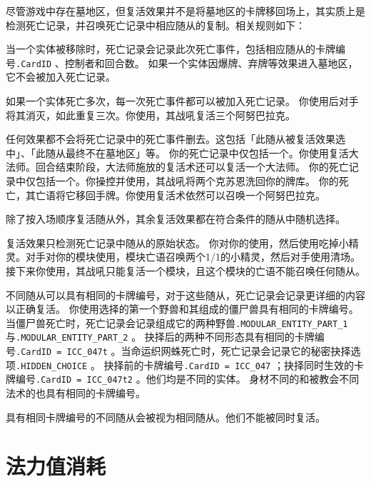 尽管游戏中存在墓地区，但复活效果并不是将墓地区的卡牌移回场上，其实质上是检测死亡记录，并召唤死亡记录中相应随从的复制。相关规则如下：

当一个实体被移除时，死亡记录会记录此次死亡事件，包括相应随从的卡牌编号\texttt{.CardID} 、控制者和回合数。
\notice 如果一个实体因爆牌、弃牌等效果进入墓地区，它不会被加入死亡记录。

如果一个实体死亡多次，每一次死亡事件都可以被加入死亡记录。
\example 你使用后对手将其消灭，如此重复三次。你使用，其战吼复活三个阿努巴拉克。

任何效果都不会将死亡记录中的死亡事件删去。这包括「此随从被复活效果选中」、「此随从最终不在墓地区」等。
\example 你的死亡记录中仅包括一个。你使用复活大法师。回合结束阶段，大法师施放的复活术还可以复活一个大法师。
\example 你的死亡记录中仅包括一个。你操控并使用，其战吼将两个克苏恩洗回你的牌库。
\example {} 你的死亡，其亡语将它移回手牌。你使用复活术依然可以召唤一个阿努巴拉克。

除了按入场顺序复活随从外，其余复活效果都在符合条件的随从中随机选择。

复活效果只检测死亡记录中随从的原始状态。
\example 你对你的使用，然后使用吃掉小精灵。对手对你的模块使用，模块亡语召唤两个1/1的小精灵，然后对手使用清场。接下来你使用，其战吼只能复活一个模块，且这个模块的亡语不能召唤任何随从。

不同随从可以具有相同的卡牌编号，对于这些随从，死亡记录会记录更详细的内容以正确复活。
\example 你使用选择的第一个野兽和其组成的僵尸兽具有相同的卡牌编号。当僵尸兽死亡时，死亡记录会记录组成它的两种野兽\texttt{.MODULAR\_ENTITY\_PART\_1}与\texttt{.MODU\-LAR\_ENTITY\_PART\_2} 。
\example {}抉择后的两种不同形态具有相同的卡牌编号\texttt{.CardID = ICC\_047t} 。当命运织网蛛死亡时，死亡记录会记录它的秘密抉择选项\texttt{.HIDDEN\_CHOICE} 。
\notice 抉择前的卡牌编号\texttt{.CardID = ICC\_047} ；抉择同时生效的卡牌编号\texttt{.CardID = ICC\_047t2} 。他们均是不同的实体。
\example 身材不同的和被教会不同法术的也具有相同的卡牌编号。

具有相同卡牌编号的不同随从会被视为相同随从。他们不能被同时复活。

\section{法力值消耗}
\label{cost}


